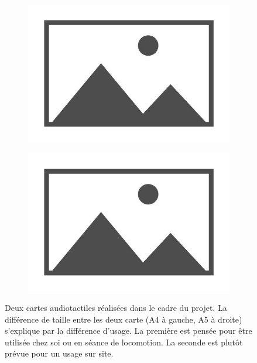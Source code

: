 \begin{figure}[ht]
    \centering
    \begin{subfigure}[t]{.49\linewidth}
        \centering
        \includegraphics[width=\textwidth]{images/placeholder.jpg}
    \end{subfigure}
    \begin{subfigure}[t]{.49\linewidth}
        \centering
        \includegraphics[width=\textwidth]{images/placeholder.jpg}
    \end{subfigure}
    \caption{Deux cartes audiotactiles réalisées dans le cadre du projet. La différence de taille entre les deux carte (A4 à gauche, A5 à droite) s'explique par la différence d'usage. La première est pensée pour être utilisée chez soi ou en séance de locomotion. La seconde est plutôt prévue pour un usage sur site.}
    \label{fig:experimentation_exemples_cartes_audiotactiles}
\end{figure}

